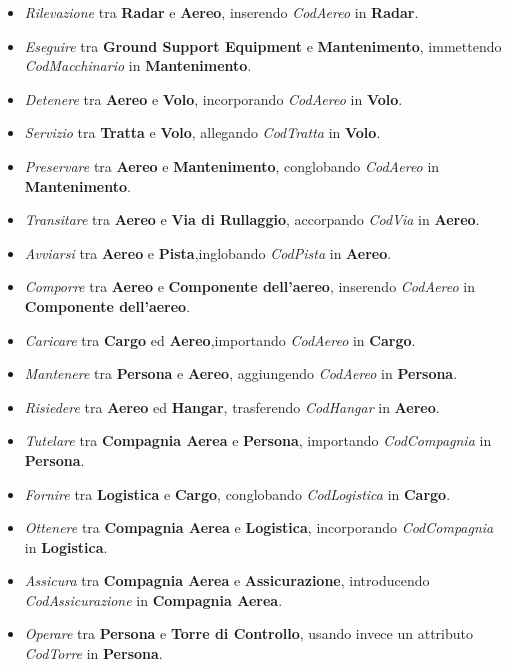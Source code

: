 \begin{itemize}
	\item \textsf{\small \emph{Rilevazione} tra \textbf{Radar} e \textbf{Aereo}, inserendo \emph{CodAereo} in \textbf{Radar}.}
	\item \textsf{\small \emph{Eseguire} tra \textbf{Ground Support Equipment} e \textbf{Mantenimento}, immettendo \emph{CodMacchinario} in \textbf{Mantenimento}.}
	\item \textsf{\small \emph{Detenere} tra \textbf{Aereo} e \textbf{Volo}, incorporando \emph{CodAereo} in \textbf{Volo}.}
	\item \textsf{\small \emph{Servizio} tra \textbf{Tratta} e \textbf{Volo}, allegando \emph{CodTratta} in \textbf{Volo}.}
	\item \textsf{\small \emph{Preservare} tra \textbf{Aereo} e \textbf{Mantenimento}, conglobando \emph{CodAereo} in \textbf{Mantenimento}.}
	\item \textsf{\small \emph{Transitare} tra \textbf{Aereo} e \textbf{Via di Rullaggio}, accorpando \emph{CodVia} in \textbf{Aereo}.}
	\item \textsf{\small \emph{Avviarsi} tra \textbf{Aereo} e \textbf{Pista},inglobando \emph{CodPista} in \textbf{Aereo}.}
	\item \textsf{\small \emph{Comporre} tra \textbf{Aereo} e \textbf{Componente dell'aereo}, inserendo \emph{CodAereo} in \textbf{Componente dell'aereo}.} %
	\item \textsf{\small \emph{Caricare} tra \textbf{Cargo} ed \textbf{Aereo},importando \emph{CodAereo} in \textbf{Cargo}.}
	\item \textsf{\small \emph{Mantenere} tra \textbf{Persona} e \textbf{Aereo}, aggiungendo \emph{CodAereo} in \textbf{Persona}.}
	\item \textsf{\small \emph{Risiedere} tra \textbf{Aereo} ed \textbf{Hangar}, trasferendo \emph{CodHangar} in \textbf{Aereo}.}
	\item \textsf{\small \emph{Tutelare} tra \textbf{Compagnia Aerea} e \textbf{Persona}, importando \emph{CodCompagnia} in \textbf{Persona}.}
	\item \textsf{\small \emph{Fornire} tra \textbf{Logistica} e \textbf{Cargo}, conglobando \emph{CodLogistica} in \textbf{Cargo}.}
	\item \textsf{\small \emph{Ottenere} tra \textbf{Compagnia Aerea} e \textbf{Logistica}, incorporando \emph{CodCompagnia} in \textbf{Logistica}.}
	\item \textsf{\small \emph{Assicura} tra \textbf{Compagnia Aerea} e \textbf{Assicurazione}, introducendo \emph{CodAssicurazione} in \textbf{Compagnia Aerea}.}
	\item \textsf{\small \emph{Operare} tra \textbf{Persona} e \textbf{Torre di Controllo}, usando invece un attributo \emph{CodTorre} in \textbf{Persona}.}
\end{itemize}

